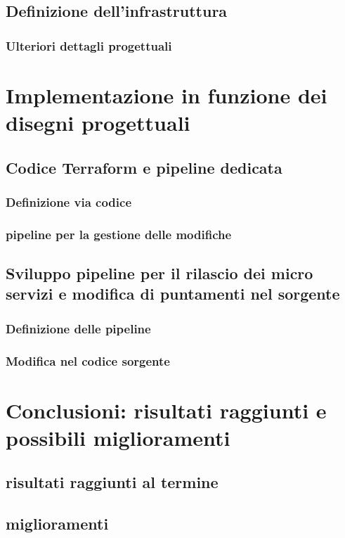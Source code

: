 \documentclass[a4paper,12pt]{report}
\begin{document}
\section{Definizione dell'infrastruttura}
\subsection{Ulteriori dettagli progettuali}

\chapter{Implementazione in funzione dei disegni progettuali}
\section{Codice Terraform e pipeline dedicata}
\subsection{Definizione via codice}
\subsection{pipeline per la gestione delle modifiche}
\section{Sviluppo pipeline per il rilascio dei micro servizi e modifica di puntamenti nel sorgente}
\subsection{Definizione delle pipeline}
\subsection{Modifica nel codice sorgente}

\chapter{Conclusioni: risultati raggiunti e possibili miglioramenti}
\section{risultati raggiunti al termine}
\section{miglioramenti}

%
%
\begin{thebibliography}{00}
%
%
%
\end{thebibliography}
% 
\end{document}
